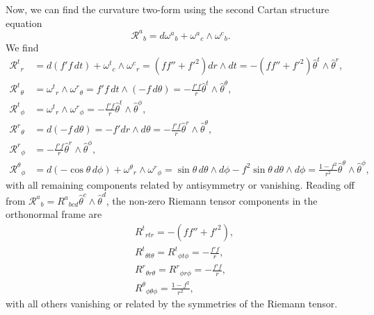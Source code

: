 \begin{solution}
    Now, we can find the curvature two-form using the second Cartan structure equation
    \begin{equation}
        \mathcal{R}^a{}_b = d\omega^a{}_b +     \omega^a{}_c \wedge \omega^c{}_b.
    \end{equation}
    We find
    \begin{align}
        \mathcal{R}^t{}_r &= d(f'f\,dt) + \omega^t{}_c\wedge\omega^c{}_r = (ff''+f'^2)dr\wedge dt = -(ff''+f'^2)\hat\theta^t\wedge\hat\theta^r,\\
        \mathcal{R}^t{}_\theta &= \omega^t{}_r\wedge\omega^r{}_\theta = f'f\,dt\wedge(-f\,d\theta) = -\frac{f'f}{r}\hat\theta^t\wedge\hat\theta^\theta,\\
        \mathcal{R}^t{}_\phi &= \omega^t{}_r\wedge\omega^r{}_\phi = -\frac{f'f}{r}\hat\theta^t\wedge\hat\theta^\phi,\\
        \mathcal{R}^r{}_\theta &= d(-f\,d\theta) = -f'dr\wedge d\theta = -\frac{f'f}{r}\hat\theta^r\wedge\hat\theta^\theta,\\
        \mathcal{R}^r{}_\phi &= -\frac{f'f}{r}\hat\theta^r\wedge\hat\theta^\phi,\\
        \mathcal{R}^\theta{}_\phi &= d(-\cos\theta\,d\phi) + \omega^\theta{}_r\wedge\omega^r{}_\phi = \sin\theta\,d\theta\wedge d\phi - f^2\sin\theta\,d\theta\wedge d\phi = \frac{1-f^2}{r^2}\hat\theta^\theta\wedge\hat\theta^\phi,
    \end{align}
    with all remaining components related by antisymmetry or vanishing. Reading off from
    $\mathcal{R}^a{}_b = R^a{}_{bcd}\hat\theta^c\wedge\hat\theta^d$, the non-zero Riemann tensor
    components in the orthonormal frame are
    \begin{align}
        &R^t{}_{rtr} = -(ff''+f'^2),\\
        &R^t{}_{\theta t\theta} = R^t{}_{\phi t\phi} = -\frac{f'f}{r},\\
        &R^r{}_{\theta r\theta} = R^r{}_{\phi r\phi} = -\frac{f'f}{r},\\
        &R^\theta{}_{\phi\theta\phi} = \frac{1-f^2}{r^2},
    \end{align}
    with all others vanishing or related by the symmetries of the Riemann tensor.
\end{solution}
